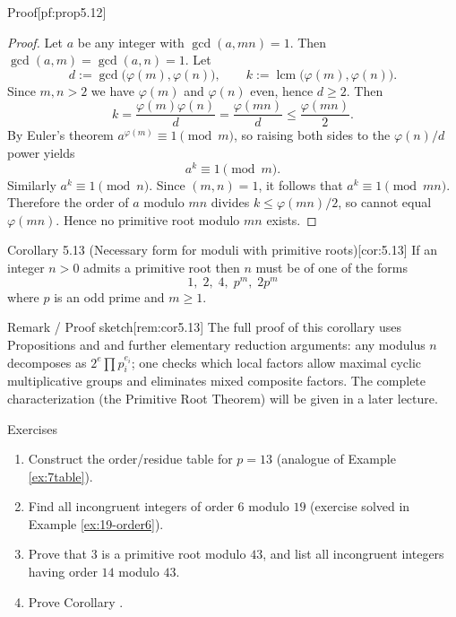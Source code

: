 \documentclass[10pt]{article}
\theoremstyle{definition}
\theoremstyle{plain}
\numberwithin{equation}{section}
\begin{document}
\begin{define}{Proof}[pf:prop5.12]
\begin{proof}
Let $a$ be any integer with $\gcd(a,mn)=1$. Then $\gcd(a,m)=\gcd(a,n)=1$. Let
\[
d:=\gcd\bigl(\varphi(m),\varphi(n)\bigr),\qquad k:=\operatorname{lcm}\bigl(\varphi(m),\varphi(n)\bigr).
\]
Since $m,n>2$ we have $\varphi(m)$ and $\varphi(n)$ even, hence $d\ge2$. Then
\[
k=\frac{\varphi(m)\varphi(n)}{d} = \frac{\varphi(mn)}{d} \le \frac{\varphi(mn)}{2}.
\]
By Euler's theorem $a^{\varphi(m)}\equiv 1\pmod m$, so raising both sides to the $\varphi(n)/d$ power yields
\[
a^k\equiv 1 \pmod m.
\]
Similarly $a^k\equiv 1\pmod n$. Since $(m,n)=1$, it follows that $a^k\equiv 1\pmod{mn}$. Therefore the order of $a$ modulo $mn$ divides $k\le \varphi(mn)/2$, so cannot equal $\varphi(mn)$. Hence no primitive root modulo $mn$ exists.
\end{proof}
\end{define}

\begin{define}{Corollary 5.13 (Necessary form for moduli with primitive roots)}[cor:5.13]
If an integer $n>0$ admits a primitive root then $n$ must be of one of the forms
\[
1,\;2,\;4,\;p^m,\;2p^m
\]
where $p$ is an odd prime and $m\ge1$.
\end{define}

\begin{define}{Remark / Proof sketch}[rem:cor5.13]
The full proof of this corollary uses Propositions  and  and further elementary reduction arguments: any modulus $n$ decomposes as $2^e\prod p_i^{e_i}$; one checks which local factors allow maximal cyclic multiplicative groups and eliminates mixed composite factors. The complete characterization (the Primitive Root Theorem) will be given in a later lecture.
\end{define}

\bigskip

\begin{define}{Exercises}
\begin{enumerate}
  \item Construct the order/residue table for $p=13$ (analogue of Example \ref{ex:7table}).
  \item Find all incongruent integers of order $6$ modulo $19$ (exercise solved in Example \ref{ex:19-order6}).
  \item Prove that $3$ is a primitive root modulo $43$, and list all incongruent integers having order $14$ modulo $43$.
  \item Prove Corollary .
\end{enumerate}
\end{define}
\end{document}
